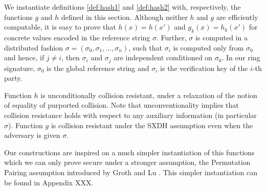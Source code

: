 
We instantiate definitions \ref{def:hash1} and \ref{def:hash2}  with, respectively, the functions $g$ and $h$ defined in this section. Although neither $h$ and $g$ are efficiently computable, it is easy to prove that $h(x)=h(x')$ and $g_k(x)=h_k(x')$ for concrete values encoded in the reference string $\sigma$. Further, $\sigma$ is computed in a distributed fashion $\sigma = (\sigma_0,\sigma_1,\ldots,\sigma_n)$, such that $\sigma_i$ is computed only from $\sigma_0$ and hence, if $j\neq i$, then $\sigma_i$ and $\sigma_j$ are independent conditioned on $\sigma_0$. In our ring signature, $\sigma_0$ is the global reference string and $\sigma_i$ is the verification key of the $i$-th party.
   
Function $h$ is unconditionally collision resistant, under a relaxation of the notion of equality of purported collision. Note that unconventionality implies that collision resistance holds with respect to any auxiliary information (in particular $\sigma$). Function $g$ is collision resistant under the SXDH assumption even when the adversary is given $\sigma$.


Our constructions are inspired on a much simpler instantiation of this functions which we can only prove secure under a stronger assumption, the Permutation Pairing assumption introduced by Groth and Lu \cite{AC:GroLu07}. This simpler instantiation can be found in Appendix XXX. 

